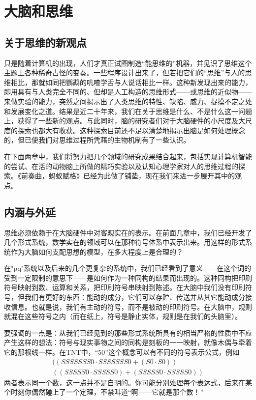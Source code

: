 
\chapter{大脑和思维}

\section{关于思维的新观点}

只是随着计算机的出现，人们才真正试图制造“能思维的”机器，并见识了思维这个主题上各种稀奇古怪的变奏。一些程序设计出来了，但若把它们的“思维”与人的思维相比，那就如同把鹦鹉的叽喳学舌与人说话相比一样。这种新发现出来的能力，即用具有与人类完全不同的、但却是人工构造的思维形式——或思维的近似物——来做实验的能力，突然之间揭示出了人类思维的特性、缺陷、威力、捉摸不定之处和发展变化之道。结果是近二十年来，我们在关于思维是什么、不是什么这一问题上，获得了一些新的观点。与此同时，脑的研究者们对于大脑硬件的小尺度及大尺度的探索也都大有收获。这种探索目前还不足以清楚地揭示出脑是如何处理概念的，但已使我们对思维过程所凭藉的生物机制有了一些认识。

在下面两章中，我们将努力把几个领域的研究成果结合起来，包括实现计算机智能的尝试、在活的动物脑上所做的精巧实验以及认知心理学家对人的思维过程的探索。《前奏曲，蚂蚁赋格》已经为此做了铺垫，现在我们来进一步展开其中的观点。

\section{内涵与外延}

思维必须依赖于在大脑硬件中对客观实在的表示。在前面几章中，我们已经开发了几个形式系统，数学实在的领域可以在那种符号体系中表示出来。用这样的形式系统作为大脑如何支配思想的模型，在多大程度上是合理的？

在"pq"系统以及后来的几个更复杂的系统中，我们已经看到了意义——在这个词的受到一定限制的意思下——是如何作为一种同构的结果而出现的。这种同构把印刷符号映射到数、运算和关系，把印刷符号串映射到陈述。在大脑中我们没有印刷符号，但我们有更好的东西：能动的成分，它们可以存贮、传送并从其它能动成分接收信息。也就是说，我们有主动的符号，而不是被动的印刷符号。在大脑中，规则就混在这些符号之内（而在纸上，符号是静止实体，规则是在我们的头脑里）。

要强调的一点是：从我们已经见到的那些形式系统所具有的相当严格的性质中不应产生这样的想法：符号与现实事物之间的同构是刻板的一一映射，就像木偶与牵着它的那根线一样。在TNT中，“$50$”这个概念可以有不同的符号表示公式，例如
\[
\begin{gathered}
((SSSSSSS0\cdot SSSSSSS0+(S0\cdot S0))\\
((SSSSS0\cdot SSSSS0)+(SSSSS0\cdot SSSSS0))
\end{gathered}
\]
两者表示同一个数，这一点并不是自明的。你可能分别处理每个表达式，后来在某个时刻你偶然碰上了一个定理，不禁叫道“啊——它就是那个数！”


